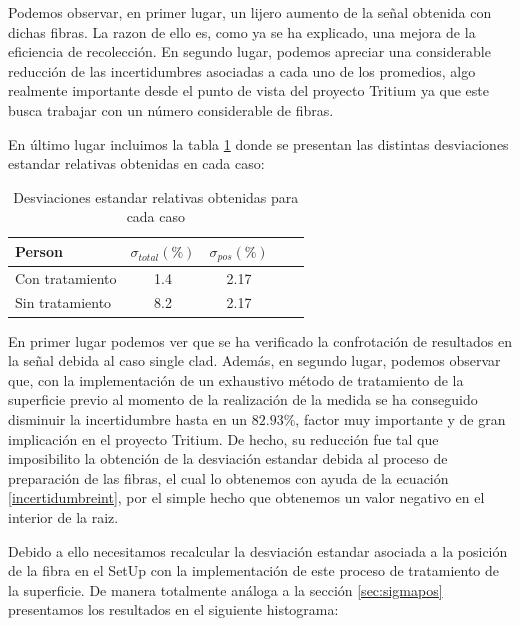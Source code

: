 Podemos observar, en primer lugar, un lijero aumento de la señal obtenida con dichas fibras. La razon de ello es, como ya se ha explicado, una mejora de la eficiencia de recolección. En segundo lugar, podemos apreciar una considerable reducción  de las incertidumbres asociadas a cada uno de los promedios, algo realmente importante desde el punto de vista del proyecto Tritium ya que este busca trabajar con un número considerable de fibras. 

En último lugar incluimos la tabla \ref{comparacionincertidumbres} donde se presentan las distintas desviaciones estandar relativas obtenidas en cada caso:

\begin{table}[H]
\begin{center}
\begin{tabular}{l | c | c | c | c }
Person & $\sigma_{total} (\%) $ & $\sigma_{pos} (\%)$\\
\hline \hline
Con tratamiento & 1.4  & 2.17\\ 
Sin tratamiento & 8.2 & 2.17\\
\end{tabular}
\caption{Desviaciones estandar relativas obtenidas para cada caso\label{comparacionincertidumbres}}
\end{center}
\end{table}

En primer lugar podemos ver que se ha verificado la confrotación de resultados en la señal debida al caso single clad. Además, en segundo lugar, podemos observar que, con la implementación de un exhaustivo método de tratamiento de la superficie previo al momento de la realización de la medida se ha conseguido disminuir la incertidumbre hasta en un $82.93\%$, factor muy importante y de gran implicación en el proyecto Tritium. De hecho, su reducción fue tal que imposibilito la obtención de la desviación estandar debida al proceso de preparación de las fibras, el cual lo obtenemos con ayuda de la ecuación \ref{incertidumbreint}, por el simple hecho que obtenemos un valor negativo en el interior de la raiz. 

Debido a ello necesitamos recalcular la desviación estandar asociada a la posición de la fibra en el SetUp con la implementación de este proceso de tratamiento de la superficie. De manera totalmente análoga a la sección \ref{sec:sigmapos} presentamos los resultados en el siguiente histograma:

